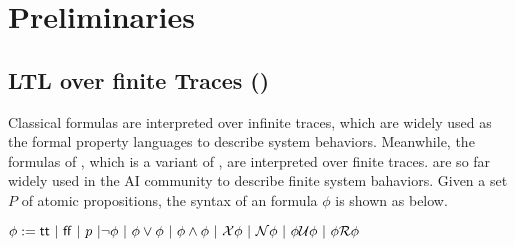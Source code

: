 \section{Preliminaries}
\subsection{LTL over finite Traces (\ltlf)}
Classical \ltl formulas are interpreted over infinite traces, which are widely used as the formal property languages to describe system behaviors. Meanwhile, the formulas of \ltlf, which is a variant of \ltl, are interpreted over finite traces. \ltlf are so far widely used in the AI community to describe finite system bahaviors. Given a set $P$ of atomic propositions, the syntax of an \ltlf formula $\phi$ is shown as below.

\begin{center}
$\phi:=\tt\ |\ \ff\ |\ p\ |\neg\phi\ |\ \phi \vee \phi\ |\ \phi \wedge \phi\ |\ \X \phi\ |\ \N \phi\ |\ \phi \U \phi\ |\ \phi \R \phi$ 
\end{center}

